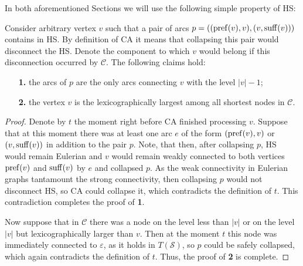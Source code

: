In both aforementioned Sections we will use the following simple property of HS:
\begin{lemma}\label{lemma:property}
    Consider arbitrary vertex $v$ such that a pair of arcs $p = ((\operatorname{pref}(v), v), (v, \operatorname{suff}(v)))$ contains in HS. By definition of CA it means that collapsing this pair would disconnect the HS. Denote the component to which $v$ would belong if this disconnection occurred by $\mathcal{C}$. The following claims hold:
    \begin{itemize}
        \item[\bf 1.] the arcs of $p$ are the only arcs connecting $v$ with the level $|v|-1$;
        \item[\bf 2.] the vertex $v$ is the lexicographically largest among all shortest nodes in $\mathcal{C}$.
    \end{itemize}    
\end{lemma}
\begin{proof}
    Denote by $t$ the moment right before CA finished processing $v$. Suppose that at this moment there was at least one arc $e$ of the form $(\operatorname{pref}(v), v)$ or $(v, \operatorname{suff}(v))$ in addition to the pair $p$. Note, that then, after collapsing $p$, HS would remain Eulerian and $v$ would remain weakly connected to both vertices $\operatorname{pref}(v)$ and $\operatorname{suff}(v)$ by $e$ and collapsed $p$. As the weak connectivity in Eulerian graphs tantamount the strong connectivity, then collapsing $p$ would not disconnect HS, so CA could collapse it, which contradicts the definition of $t$. This contradiction completes the proof of {\bf 1}.
    
    Now suppose that in $\mathcal{C}$ there was a node on the level less than $|v|$ or on the level $|v|$ but lexicographically larger than $v$. Then at the moment $t$ this node was immediately connected to $\varepsilon$, as it holds in $T(\mathcal{S})$, so $p$ could be safely collapsed, which again contradicts the definition of $t$. Thus, the proof of {\bf 2} is complete.
\end{proof}
%
%
%
%
